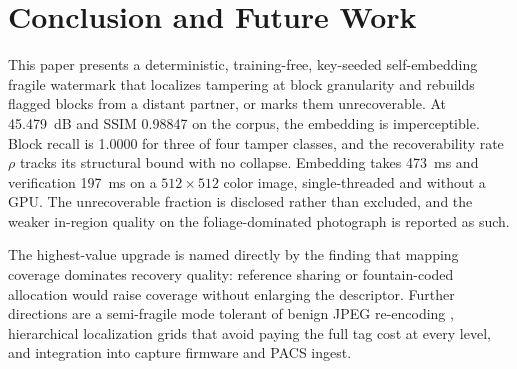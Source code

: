 \section{Conclusion and Future Work}
\label{sec:conclusion}

This paper presents a deterministic, training-free, key-seeded self-embedding fragile watermark that localizes tampering at block granularity and rebuilds flagged blocks from a distant partner, or marks them unrecoverable. At 45.479~dB and SSIM 0.98847 on the corpus, the embedding is imperceptible. Block recall is 1.0000 for three of four tamper classes, and the recoverability rate $\rho$ tracks its structural bound with no collapse. Embedding takes 473~ms and verification 197~ms on a $512\times512$ color image, single-threaded and without a GPU. The unrecoverable fraction is disclosed rather than excluded, and the weaker in-region quality on the foliage-dominated photograph is reported as such.

The highest-value upgrade is named directly by the finding that mapping coverage dominates recovery quality: reference sharing or fountain-coded allocation \cite{zhang2011reference,korus2013efficient} would raise coverage without enlarging the descriptor. Further directions are a semi-fragile mode tolerant of benign JPEG re-encoding \cite{linchang2000}, hierarchical localization grids that avoid paying the full tag cost at every level, and integration into capture firmware and PACS ingest.
